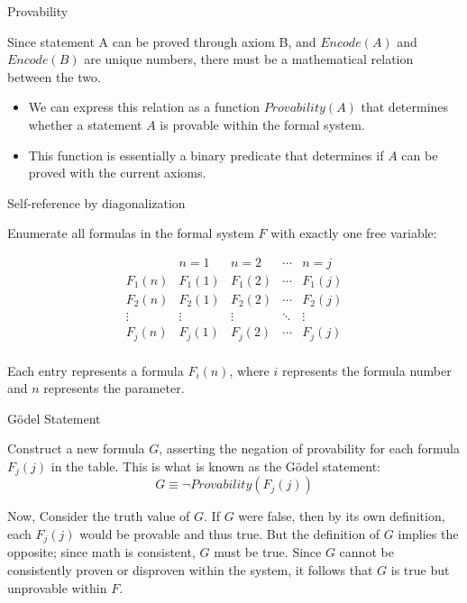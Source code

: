 \documentclass[final]{beamer} %
\newlength{\colwidth}
\begin{document}
\begin{frame}[t]
\begin{columns}[t]
\begin{column}{\colwidth}
 \begin{block}{Provability}

Since statement A can be proved through axiom B, and $Encode(A)$ and $Encode(B)$ are unique numbers, there must be a mathematical relation between the two.

 \begin{itemize}
    
    \item We can express this relation as a function $Provability(A)$ that determines whether a statement $A$ is provable within the formal system.
    
    \item This function is essentially a binary predicate that determines if $A$ can be proved with the current axioms.
    
    \end{itemize}

 \end{block}


 \begin{block}{Self-reference by diagonalization}

    Enumerate all formulas in the formal system $F$ with exactly one free variable:
    
    \[
    \begin{array}{c|c|c|c|c}
    & n=1 & n=2 & \cdots & n = j \\
    \hline
    F_1(n) & F_1(1) & F_1(2) & \cdots & F_1(j) \\
    F_2(n) & F_2(1) & F_2(2) & \cdots & F_2(j) \\
    \vdots & \vdots & \vdots & \ddots & \vdots \\
    F_j(n) & F_j(1) & F_j(2) & \cdots & F_j(j) \\
    \end{array}
    \]


Each entry represents a formula \( F_i(n) \), where \( i \) represents the formula number and \( n \) represents the parameter.
\end{block}

\begin{block}{Gödel Statement}

Construct a new formula $G$, asserting the negation of provability for each formula $F_j(j)$ in the table. This is what is known as the Gödel statement:
$$G \equiv \neg Provability(F_j(j))$$

 Now, Consider the truth value of $G$. If $G$ were false, then by its own definition, each $F_j(j)$ would be provable and thus true. But the definition of $G$ implies the opposite; since math is consistent, $G$ must be true. Since $G$ cannot be consistently proven or disproven within the system, it follows that $G$ is true but unprovable within $F$.
 

\end{block}
\end{column}
\end{columns}
\end{frame}
\end{document}
